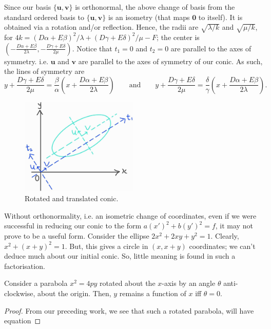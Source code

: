 \documentclass[../Notes.tex]{subfiles}
\begin{document}
Since our basis \(\{\mathbf{u},\mathbf{v}\}\) is orthonormal, the above change of basis from the standard ordered basis to \(\{\mathbf{u},\mathbf{v}\}\) is an isometry (that maps \(\mathbf{0}\) to itself). It is obtained via a rotation and/or reflection. Hence, the radii are \(\sqrt{\lambda/k}\) and \(\sqrt{\mu/k}\), for \(4k=(D\alpha+E\beta)^2/\lambda+(D\gamma+E\delta)^2/\mu-F\); the center is \(\left(-\frac{D\alpha+E\beta}{2\lambda},-\frac{D\gamma+E\delta}{2\mu} \right)\). Notice that \(t_1=0\) and \(t_2=0\) are parallel to the axes of symmetry. i.e. \(\mathbf{u}\) and \(\mathbf{v}\) are parallel to the axes of symmetry of our conic. As such, the lines of symmetry are 
\[y+\frac{D\gamma+E\delta}{2\mu}=\frac{\beta}{\alpha}\left( x+\frac{D\alpha+E\beta}{2\lambda} \right) \qquad\text{and}\qquad y+\frac{D\gamma+E\delta}{2\mu}=\frac{\delta}{\gamma}\left( x+\frac{D\alpha+E\beta}{2\lambda} \right).\]
\begin{figure}[htbp]
    \centering
    \includegraphics[width=0.5\textwidth]{../Diagrams/rotated-conics.jpg}
    \caption{Rotated and translated conic.}
    \label{fig:rotated-conic}
\end{figure}
\begin{note}
    Without orthonormality, i.e. an isometric change of coordinates, even if we were successful in reducing our conic to the form \(a(x')^2+b(y')^2=f\), it may not prove to be a useful form. Consider the ellipse \(2x^2+2xy+y^2=1\). Clearly, \(x^2+(x+y)^2=1\). But, this gives a circle in \((x,x+y)\) coordinates; we can't deduce much about our initial conic. So, little meaning is found in such a factorisation. 
\end{note}
\begin{corollary}{}{}
    Consider a parabola \(x^2=4py\) rotated about the \(x\)-axis by an angle \(\theta\) anti-clockwise, about the origin. Then, \(y\) remains a function of \(x\) iff \(\theta=0\).
\end{corollary}
\begin{proof}
    From our preceding work, we see that such a rotated parabola, will have equation
     
\end{proof}
\end{document}
